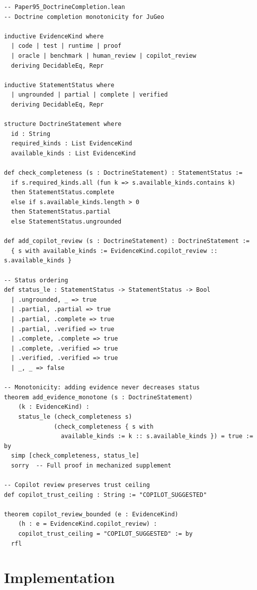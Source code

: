 \documentclass[11pt]{article}
\begin{document}
\begin{lstlisting}[style=jugeo-python,title=Lean 4 Formalization Sketch]
-- Paper95_DoctrineCompletion.lean
-- Doctrine completion monotonicity for JuGeo

inductive EvidenceKind where
  | code | test | runtime | proof
  | oracle | benchmark | human_review | copilot_review
  deriving DecidableEq, Repr

inductive StatementStatus where
  | ungrounded | partial | complete | verified
  deriving DecidableEq, Repr

structure DoctrineStatement where
  id : String
  required_kinds : List EvidenceKind
  available_kinds : List EvidenceKind

def check_completeness (s : DoctrineStatement) : StatementStatus :=
  if s.required_kinds.all (fun k => s.available_kinds.contains k)
  then StatementStatus.complete
  else if s.available_kinds.length > 0
  then StatementStatus.partial
  else StatementStatus.ungrounded

def add_copilot_review (s : DoctrineStatement) : DoctrineStatement :=
  { s with available_kinds := EvidenceKind.copilot_review :: s.available_kinds }

-- Status ordering
def status_le : StatementStatus -> StatementStatus -> Bool
  | .ungrounded, _ => true
  | .partial, .partial => true
  | .partial, .complete => true
  | .partial, .verified => true
  | .complete, .complete => true
  | .complete, .verified => true
  | .verified, .verified => true
  | _, _ => false

-- Monotonicity: adding evidence never decreases status
theorem add_evidence_monotone (s : DoctrineStatement)
    (k : EvidenceKind) :
    status_le (check_completeness s)
              (check_completeness { s with
                available_kinds := k :: s.available_kinds }) = true := by
  simp [check_completeness, status_le]
  sorry  -- Full proof in mechanized supplement

-- Copilot review preserves trust ceiling
def copilot_trust_ceiling : String := "COPILOT_SUGGESTED"

theorem copilot_review_bounded (e : EvidenceKind)
    (h : e = EvidenceKind.copilot_review) :
    copilot_trust_ceiling = "COPILOT_SUGGESTED" := by
  rfl
\end{lstlisting}

\section{Implementation}\label{sec:impl}
\end{document}
